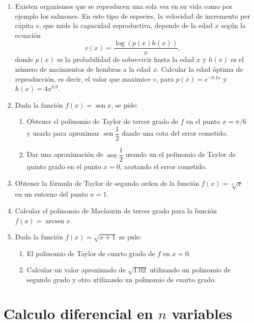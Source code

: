 \documentclass[a4paper,titlepage]{article}
\DeclareMathOperator{\sen}{sen}
\DeclareMathOperator{\arcsen}{arcsen}
\theoremstyle{solution}
\begin{document}
\begin{enumerate}[leftmargin=*]
\item Existen organismos que se reproducen una sola vez en su vida como por ejemplo los salmones. 
En este tipo de especies, la velocidad de incremento per cápita $v$, que mide la capacidad reproductiva, depende de la edad $x$ según la ecuación
\[
v(x) = \frac{\log(p(x)h(x))}{x},
\] 
donde $p(x)$ es la probabilidad de sobrevivir hasta la edad $x$ y $h(x)$ es el número de nacimientos de hembras a la edad $x$. 
Calcular la edad óptima de reproducción, es decir, el valor que maximice $v$, para $p(x)=e^{-0.1x}$ y $h(x)=4x^{0.9}$.

\item Dada la función $f(x)=\sen x$, se pide:
\begin{enumerate}
\item Obtener el polinomio de Taylor de tercer grado de $f$ en el punto $x=\pi/6$ y usarlo para aproximar $\sen\dfrac{1}{2}$ dando una cota del error cometido.
\item Dar una aproximación de $\sen\dfrac{1}{2}$ usando un el polinomio de Taylor de quinto grado en el punto $x=0$, acotando el error cometido.
\end{enumerate}

\item Obtener la fórmula de Taylor de segundo orden de la función $f(x)=\sqrt[3]{x}$ en un entorno del punto $x=1$.

\item Calcular el polinomio de Maclaurin de tercer grado para la función $f(x)=\arcsen x$.

\item Dada la función $f(x)=\sqrt{x+1}$ se pide:
\begin{enumerate}
\item  El polinomio de Taylor de cuarto grado de $f$ en $x=0$.
\item  Calcular un valor aproximado de $\sqrt{1.02}$ utilizando un polinomio de segundo grado y otro utilizando un polinomio de cuarto grado.
\end{enumerate}

\end{enumerate}


\section{Calculo diferencial en $n$ variables}
\end{document}
